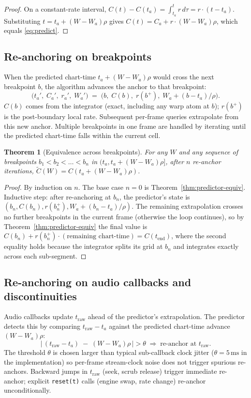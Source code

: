 \documentclass[11pt]{article}
\newtheorem{theorem}{Theorem}
\theoremstyle{definition}
\begin{document}
\begin{proof}
On a constant-rate interval, $C(t) - C(t_a) = \int_{t_a}^{t} r\,d\tau =
r \cdot (t - t_a)$. Substituting $t = t_a + (W - W_a)\rho$ gives
$C(t) = C_a + r \cdot (W - W_a)\rho$, which equals \eqref{eq:predict}.
\qedhere
\end{proof}

\subsection{Re-anchoring on breakpoints}

When the predicted chart-time $t_a + (W - W_a)\rho$ would cross the next
breakpoint $b$, the algorithm advances the anchor to that breakpoint:
\[
\bigl(t_a',\;C_a',\;r_a',\;W_a'\bigr) \;=\;
\bigl(b,\; C(b),\; r(b^+),\; W_a + (b - t_a)/\rho\bigr).
\]
$C(b)$ comes from the integrator (exact, including any warp atom at $b$);
$r(b^+)$ is the post-boundary local rate. Subsequent per-frame queries
extrapolate from this new anchor. Multiple breakpoints in one frame are
handled by iterating until the predicted chart-time falls within the
current cell.

\begin{theorem}[Equivalence across breakpoints]
\label{thm:predictor-bp}
For any $W$ and any sequence of breakpoints $b_1 < b_2 < \dots < b_n$ in
$(t_a, t_a + (W - W_a)\rho]$, after $n$ re-anchor iterations,
$\widetilde{C}(W) = C(t_a + (W - W_a)\rho)$.
\end{theorem}

\begin{proof}
By induction on $n$. The base case $n = 0$ is Theorem~\ref{thm:predictor-equiv}.
Inductive step: after re-anchoring at $b_n$, the predictor's state is
$(b_n, C(b_n), r(b_n^+), W_a + (b_n - t_a)/\rho)$. The remaining
extrapolation crosses no further breakpoints in the current frame
(otherwise the loop continues), so by Theorem~\ref{thm:predictor-equiv}
the final value is $C(b_n) + r(b_n^+) \cdot (\text{remaining chart-time}) =
C(t_{\mathrm{end}})$, where the second equality holds because the
integrator splits its grid at $b_n$ and integrates exactly across each
sub-segment. \qedhere
\end{proof}

\subsection{Re-anchoring on audio callbacks and discontinuities}

Audio callbacks update $t_{\mathrm{raw}}$ ahead of the predictor's
extrapolation. The predictor detects this by comparing
$t_{\mathrm{raw}} - t_a$ against the predicted chart-time advance
$(W - W_a)\rho$:
\[
\bigl|\,(t_{\mathrm{raw}} - t_a) \;-\; (W - W_a)\rho\,\bigr| > \theta
\;\Longrightarrow\;\text{re-anchor at } t_{\mathrm{raw}}.
\]
The threshold $\theta$ is chosen larger than typical sub-callback clock
jitter ($\theta = 5\,\mathrm{ms}$ in the implementation) so per-frame
stream-clock noise does not trigger spurious re-anchors. Backward jumps
in $t_{\mathrm{raw}}$ (seek, scrub release) trigger immediate re-anchor;
explicit \texttt{reset(t)} calls (engine swap, rate change) re-anchor
unconditionally.
\end{document}
